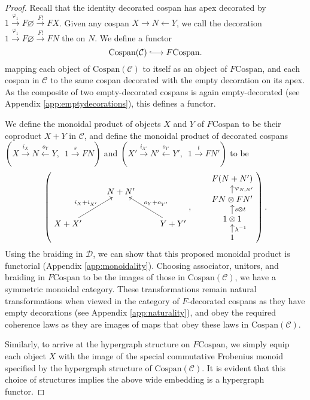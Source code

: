 \begin{proof}
  Recall that the identity decorated cospan has apex decorated by $1
  \stackrel{\varphi_1}\longrightarrow F\varnothing \stackrel{F!}\longrightarrow
  FX$. Given any cospan $X \to N \leftarrow Y$, we call the decoration $1
  \stackrel{\varphi_1}\longrightarrow F\varnothing \stackrel{F!}\longrightarrow
  FN$ the  on $N$. We define a functor 
  \[
    \mathrm{Cospan(\mathcal C)} \hooklongrightarrow F\mathrm{Cospan}.
  \]
  mapping each object of $\mathrm{Cospan(\mathcal C)}$ to itself as an object
  of $F\mathrm{Cospan}$, and each cospan in $\mathcal C$ to the same cospan
  decorated with the empty decoration on its apex. As the composite of two
  empty-decorated cospans is again empty-decorated (see Appendix
  \ref{app:emptydecorations}), this defines a functor.

  We define the monoidal product of objects $X$ and $Y$ of $F\mathrm{Cospan}$ to
  be their coproduct $X+Y$ in $\mathcal C$, and define the monoidal product of
  decorated cospans $(X \stackrel{i_X}\longrightarrow N
  \stackrel{o_Y}\longleftarrow Y,\enspace 1 \stackrel{s}\longrightarrow FN)$ and
  $(X' \stackrel{i_{X'}}\longrightarrow N' \stackrel{o_{Y'}}\longleftarrow
  Y',\enspace 1 \stackrel{t}\longrightarrow FN')$ to be 
  \[
    \left(
    \begin{aligned}
      \xymatrix{
	& N+N' \\  
	X+X' \ar[ur]^{i_X+i_{X'}} && Y+Y' \ar[ul]_{o_Y+o_{Y'}}
      }
    \end{aligned}
    ,
    \qquad
    \begin{aligned}
      \xymatrixrowsep{.8pc}
      \xymatrix{
	F(N+N') \\
	FN \otimes FN' \ar[u]_{\varphi_{N,N'}}\\
	1 \otimes 1 \ar[u]_{s \otimes t} \\
	1 \ar[u]_{\lambda^{-1}}
      }
    \end{aligned}
    \right).
  \]
  Using the braiding in $\mathcal D$, we can show that this proposed monoidal
  product is functorial (Appendix \ref{app:monoidality}). Choosing associator,
  unitors, and braiding in $F\mathrm{Cospan}$ to be the images of those in
  $\mathrm{Cospan(\mathcal{C})}$, we have a symmetric monoidal category. These
  transformations remain natural transformations when viewed in the category of
  $F$-decorated cospans as they have empty decorations (see Appendix
  \ref{app:naturality}), and obey the required coherence laws as they are
  images of maps that obey these laws in $\mathrm{Cospan(\mathcal{C})}$. 

  Similarly, to arrive at the hypergraph structure on $F\mathrm{Cospan}$, we
  simply equip each object $X$ with the image of the special commutative
  Frobenius monoid specified by the hypergraph structure of
  $\mathrm{Cospan(\mathcal{C})}$. It is evident that this choice of structures
  implies the above wide embedding is a hypergraph functor.
\end{proof}

